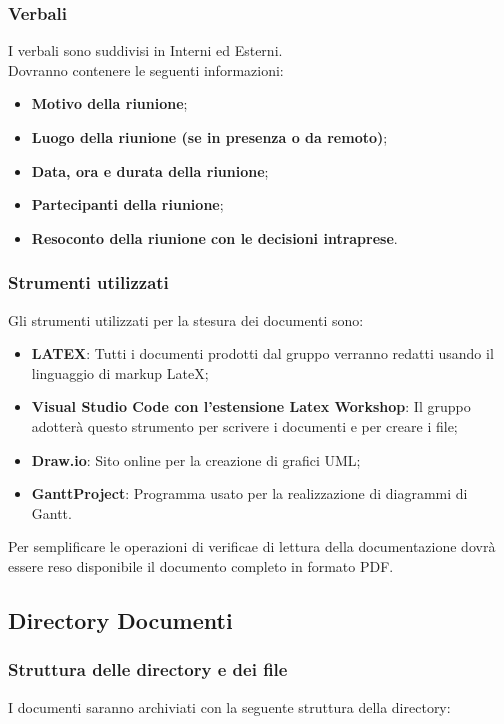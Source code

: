 \subsubsection{Verbali}\label{Verbali}
I verbali sono suddivisi in Interni ed Esterni.\\
Dovranno contenere le seguenti informazioni:
\begin{itemize}
    \item \textbf{Motivo della riunione};
    \item \textbf{Luogo della riunione (se in presenza o da remoto)};
    \item \textbf{Data, ora e durata della riunione};
    \item \textbf{Partecipanti della riunione};
    \item \textbf{Resoconto della riunione con le decisioni intraprese}.
\end{itemize}

\subsubsection{Strumenti utilizzati}
Gli strumenti utilizzati per la stesura dei documenti sono:
\begin{itemize}
    \item \textbf{LATEX}: Tutti i documenti prodotti dal gruppo verranno redatti usando il linguaggio di markup LateX;
    \item \textbf{Visual Studio Code con l’estensione Latex Workshop}: Il gruppo adotterà questo strumento per scrivere i documenti e per creare i file;
    \item \textbf{Draw.io}: Sito online per la creazione di grafici UML;
    \item \textbf{GanttProject}: Programma usato per la realizzazione di diagrammi di Gantt.
\end{itemize}
Per semplificare le operazioni di verifica\glo e di lettura della documentazione dovrà essere reso disponibile il documento completo in formato PDF.


\newpage
\subsection{Directory Documenti}
\subsubsection{Struttura delle directory e dei file}\label{Dir}
I documenti saranno archiviati con la seguente struttura della directory: \\

